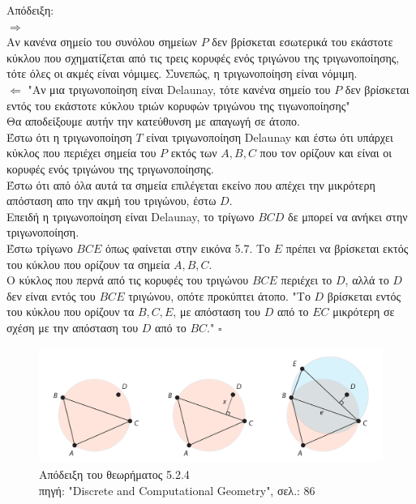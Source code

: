 \documentclass[oneside,12pt]{book}
\newenvironment{matlab}
	{\begin{figure}[hp]\centering\captionsetup{justification=centering}}
	{\end{figure}}
\theoremstyle{definition}
\begin{document}
Απόδειξη: \\
\(\Rightarrow \) \\
Αν κανένα σημείο του συνόλου σημείων \(P\) δεν βρίσκεται εσωτερικά του εκάστοτε κύκλου που σχηματίζεται από τις τρεις κορυφές ενός τριγώνου της τριγωνοποίησης, τότε όλες οι ακμές είναι νόμιμες. Συνεπώς, η τριγωνοποίηση είναι νόμιμη. \\
\(\Leftarrow \) "Αν μια τριγωνοποίηση είναι Delaunay, τότε κανένα σημείο του \(P\) δεν βρίσκεται εντός του εκάστοτε κύκλου τριών κορυφών τριγώνου της τιγωνοποίησης" \\
Θα αποδείξουμε αυτήν την κατεύθυνση με απαγωγή σε άτοπο. \\
Έστω ότι η τριγωνοποίηση \(T\) είναι τριγωνοποίηση Delaunay και έστω ότι υπάρχει κύκλος που περιέχει σημεία του \(P\) εκτός των \(A, B, C\) που τον ορίζουν και είναι οι κορυφές ενός τριγώνου της τριγωνοποίησης. \\
Έστω ότι από όλα αυτά τα σημεία επιλέγεται εκείνο που απέχει την μικρότερη απόσταση απο την ακμή του τριγώνου, έστω \(D\). \\
Επειδή η τριγωνοποίηση είναι Delaunay, το τρίγωνο \(BCD\) δε μπορεί να ανήκει στην τριγωνοποίηση. \\
Έστω τρίγωνο \(BCE\) όπως φαίνεται στην εικόνα 5.7. Το \(E\) πρέπει να βρίσκεται εκτός του κύκλου που ορίζουν τα σημεία \(A, B, C\). \\
Ο κύκλος που περνά από τις κορυφές του τριγώνου \(BCE\) περιέχει το \(D\), αλλά το \(D\) δεν είναι εντός του \(BCE\) τριγώνου, οπότε προκύπτει άτοπο. "Το \(D\) βρίσκεται εντός του κύκλου που ορίζουν τα \(B,C,E\), με απόσταση του \(D\) από το \(EC\) μικρότερη σε σχέση με την απόσταση του \(D\) από το \(BC\)." \(\square\) \\

\begin{matlab}
	\includegraphics[scale=0.3]{images/emptycircle.png}
	\caption{Απόδειξη του θεωρήματος 5.2.4 \\ πηγή: "Discrete and Computational Geometry", σελ.: 86}
\end{matlab}
\end{document}
